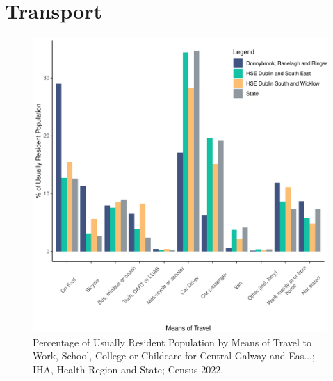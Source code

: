 \documentclass{article}
\begin{document}
\section{Transport}\label{sect:Trans}
\begin{figure}[H]
	\centering
	\includegraphics[width = 120mm]{../figures/TravelED.pdf}
	\caption{Percentage of Usually Resident Population by Means of Travel to Work, School, College or Childcare for Central Galway and Eas...; IHA, Health Region and State; Census 2022.}
	\label{fig:vbnv}
	\end{figure}
\end{document}
